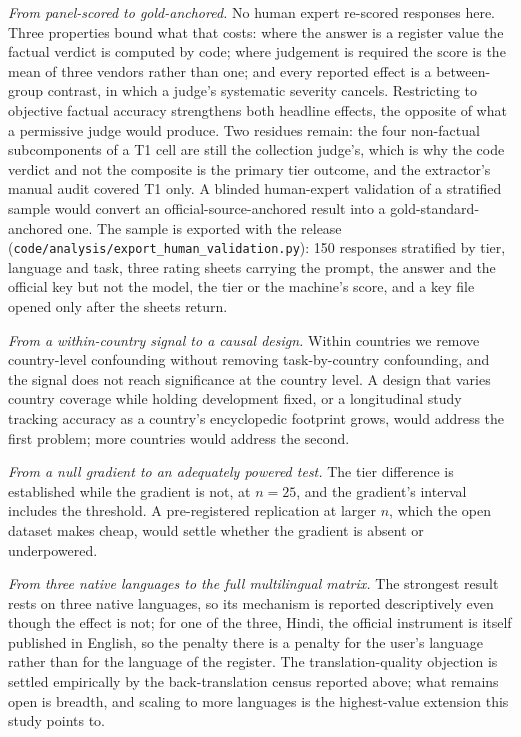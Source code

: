 \emph{From panel-scored to gold-anchored.} No human expert re-scored responses
here. Three properties bound what that costs: where the answer is a register
value the factual verdict is computed by code; where judgement is required the
score is the mean of three vendors rather than one; and every reported effect is
a between-group contrast, in which a judge's systematic severity cancels.
Restricting to objective factual accuracy strengthens both headline effects, the
opposite of what a permissive judge would produce. Two residues remain: the four
non-factual subcomponents of a T1 cell are still the collection judge's, which
is why the code verdict and not the composite is the primary tier outcome, and
the extractor's manual audit covered T1 only. A blinded human-expert validation
of a stratified sample would convert an official-source-anchored result into a
gold-standard-anchored one. The sample is exported with the release
(\texttt{code/analysis/export\_human\_validation.py}): 150 responses
stratified by tier, language and task, three rating sheets carrying the prompt,
the answer and the official key but not the model, the tier or the machine's
score, and a key file opened only after the sheets return.

\emph{From a within-country signal to a causal design.} Within countries we
remove country-level confounding without removing task-by-country confounding,
and the signal does not reach significance at the country level. A design that
varies country coverage while holding development fixed, or a longitudinal
study tracking accuracy as a country's encyclopedic footprint grows, would
address the first problem; more countries would address the second.

\emph{From a null gradient to an adequately powered test.} The tier difference
is established while the gradient is not, at $n=25$, and the gradient's
interval includes the threshold. A pre-registered replication at larger $n$,
which the open dataset makes cheap, would settle whether the gradient is absent
or underpowered.

\emph{From three native languages to the full multilingual matrix.} The
strongest result rests on three native languages, so its mechanism is reported
descriptively even though the effect is not; for one of the three, Hindi, the
official instrument is itself published in English, so the penalty there is a
penalty for the user's language rather than for the language of the register.
The translation-quality objection is settled empirically by the back-translation
census reported above; what remains open is breadth, and scaling to more
languages is the highest-value extension this study points to.

